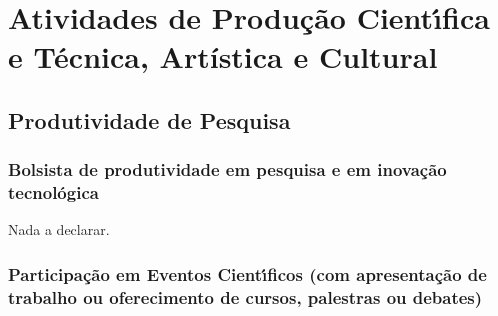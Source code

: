 \documentclass[a4paper,oneside,10pt]{article}
\begin{document}
\newpage
\section{Atividades de Produ\c{c}\~{a}o Cient\'{\i}fica e T\'{e}cnica, Art\'{i}stica e Cultural}

\subsection{Produtividade de Pesquisa}
\vspace{0.3cm}


\subsubsection{Bolsista de produtividade em pesquisa e em inova\c{c}\~{a}o tecnol\'{o}gica}
\vspace{0.3cm}

Nada a declarar.


\subsubsection{Participa\c{c}\~{a}o em Eventos Cient\'{\i}ficos (com apresenta\c{c}\~{a}o de trabalho ou oferecimento de cursos, palestras ou debates)}
\vspace{0.3cm}
\end{document}
